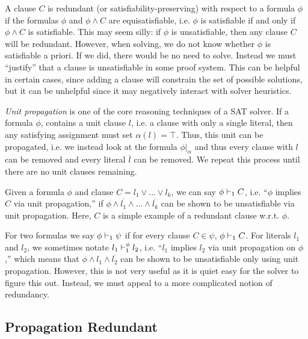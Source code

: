 A clause $C$ is redundant (or satisfiability-preserving) with respect to a formula $\phi$ if the formulas $\phi$ and $\phi \land C$ are equisatisfiable, i.e. $\phi$ is satisfiable if and only if $\phi \land C$ is satisfiable. This may seem silly: if $\phi$ is unsatisfiable, then any clause $C$ will be redundant. However, when solving, we do not know whether $\phi$ is satisfiable a priori. If we did, there would be no need to solve. Instead we must ``justify'' that a clause is unsatisfiable in some proof system. This can be helpful in certain cases, since adding a clause will constrain the set of possible solutions, but it can be unhelpful since it may negatively interact with solver heuristics.

\emph{Unit propagation} is one of the core reasoning techniques of a SAT solver. If a formula $\phi$, contains a unit clause $l$, i.e. a clause with only a single literal, then any satisfying assignment must set $\alpha(l) = \top$. Thus, this unit can be propagated, i.e. we instead look at the formula $\phi|_\alpha$ and thus every clause with $l$ can be removed and every literal $\overline{l}$ can be removed. We repeat this process until there are no unit clauses remaining.

Given a formula $\phi$ and clause $C = l_1 \lor ... \lor l_k$, we can say $\phi \vdash_1 C$, i.e. ``$\phi$ implies $C$ via unit propagation,'' if $\phi \land \overline{l_1} \land ... \land \overline{l_k}$ can be shown to be unsatisfiable via unit propagation. Here, $C$ is a simple example of a redundant clause w.r.t. $\phi$. 



For two formulas we say $\phi \vdash_1 \psi$ if for every clause $C \in \psi$, $\phi \vdash_1 C$. For literals $l_1$ and $l_2$, we sometimes notate $l_1 \vdash_1^\phi l_2$, i.e. ``$l_1$ implies $l_2$ via unit propagation on $\phi$,'' which means that $\phi \land l_1 \land \overline{l_2}$ can be shown to be unsatisfiable only using unit propagation.  %
However, this is not very useful as it is quiet easy for the solver to figure this out. Instead, we must appeal to a more complicated notion of redundancy.


\subsection{Propagation Redundant}~\label{subsec:pr}


